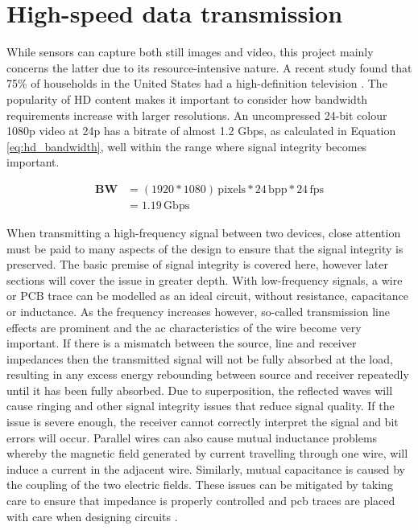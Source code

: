 \documentclass[a4paper]{report}
\begin{document}
\section{High-speed data transmission}

While sensors can capture both still images and video, this project mainly concerns the latter due to its resource-intensive nature. A recent study found that 75\% of households in the United States had a high-definition television \cite{14_leichtman_research_group_2013}. The popularity of HD content makes it important to consider how bandwidth requirements increase with larger resolutions. An uncompressed 24-bit colour 1080p video at 24p has a bitrate of almost 1.2 Gbps, as calculated in Equation \ref{eq:hd_bandwidth}, well within the range where signal integrity becomes important.

\begin{equation}
  \begin{split}
    \mathbf{BW} &= (1920*1080) \, \mathrm{pixels} * 24  \, \mathrm{bpp} * 24 \, \mathrm{fps} \\
                &= 1.19  \, \mathrm{Gbps}
  \end{split}  
  \label{eq:hd_bandwidth}
\end{equation}

When transmitting a high-frequency signal between two devices, close attention must be paid to many aspects of the design to ensure that the signal integrity is preserved. The basic premise of signal integrity is covered here, however later sections will cover the issue in greater depth. With low-frequency signals, a wire or PCB trace can be modelled as an ideal circuit, without resistance, capacitance or inductance. As the frequency increases however, so-called transmission line effects are prominent and the \gls{ac} characteristics of the wire become very important. If there is a mismatch between the source, line and receiver impedances then the transmitted signal will not be fully absorbed at the load, resulting in any excess energy rebounding between source and receiver repeatedly until it has been fully absorbed. Due to superposition, the reflected waves will cause ringing and other signal integrity issues that reduce signal quality. If the issue is severe enough, the receiver cannot correctly interpret the signal and bit errors will occur. Parallel wires can also cause mutual inductance problems whereby the magnetic field generated by current travelling through one wire, will induce a current in the adjacent wire. Similarly, mutual capacitance is caused by the coupling of the two electric fields. These issues can be mitigated by taking care to ensure that impedance is properly controlled and \gls{pcb} traces are placed with care when designing circuits \cite{15_basic_principles_of_signal_integrity_2007}.
\end{document}

